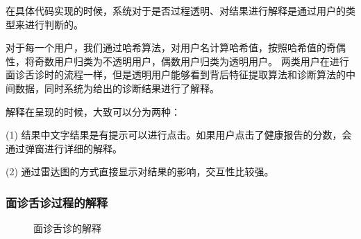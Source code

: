 在具体代码实现的时候，系统对于是否过程透明、对结果进行解释是通过用户的类型来进行判断的。

对于每一个用户，我们通过哈希算法，对用户名计算哈希值，按照哈希值的奇偶性，将奇数用户归类为不透明用户，偶数用户归类为透明用户。
两类用户在进行面诊舌诊时的流程一样，但是透明用户能够看到背后特征提取算法和诊断算法的中间数据，同时系统为给出的诊断结果进行了解释。


解释在呈现的时候，大致可以分为两种：

(1) 结果中文字结果是有提示可以进行点击。如果用户点击了健康报告的分数，会通过弹窗进行详细的解释。

(2) 通过雷达图的方式直接显示对结果的影响，交互性比较强。

\subsubsection{面诊舌诊过程的解释}

\begin{figure}
    \centering
    \caption{面诊舌诊的解释}
    \label{fig:face_diags}
\end{figure}

